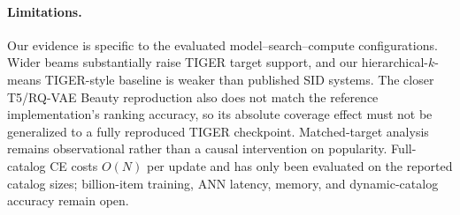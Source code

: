 \documentclass[preprint,12pt]{elsarticle}
\begin{document}


\paragraph{Limitations.}
Our evidence is specific to the evaluated model--search--compute
configurations. Wider beams substantially raise TIGER target support, and our
hierarchical-$k$-means TIGER-style baseline is weaker than published SID
systems. The closer T5/RQ-VAE Beauty reproduction also does not match the
reference implementation's ranking accuracy, so its absolute coverage effect
must not be generalized to a fully reproduced TIGER checkpoint. Matched-target
analysis remains observational rather than a causal intervention on
popularity. Full-catalog CE costs
$O(N)$ per update and has only been evaluated on the reported catalog sizes;
billion-item training, ANN latency, memory, and dynamic-catalog accuracy remain
open.


\end{document}
